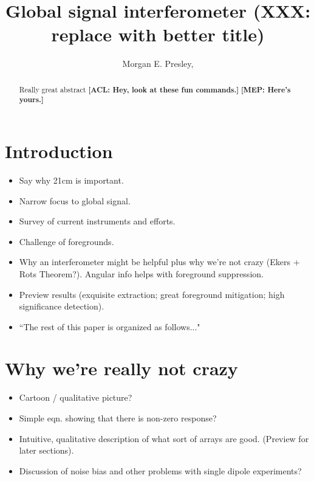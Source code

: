 \documentclass[twolcolumn,apj]{emulateapj}
\newcommand{\acl}[1]{{\color{red} \textbf{[ACL:  #1]}}}
\newcommand{\mep}[1]{{\color{blue} \textbf{[MEP:  #1]}}}
\begin{document}
\title{Global signal interferometer (XXX: replace with better title)}

\author{Morgan E. Presley,
}

\begin{abstract}
Really great abstract
\acl{Hey, look at these fun commands.}
\mep{Here's yours.}
\end{abstract}



\section{Introduction}
\begin{itemize}
\item Say why 21cm is important.
\item Narrow focus to global signal.
\item Survey of current instruments and efforts.
\item Challenge of foregrounds.
\item Why an interferometer might be helpful plus why we're not crazy (Ekers + Rots Theorem?).  Angular info helps with foreground suppression.
\item Preview results (exquisite extraction; great foreground mitigation; high significance detection).
\item ``The rest of this paper is organized as follows..."
\end{itemize}

\section{Why we're really not crazy}
\begin{itemize}
\item Cartoon / qualitative picture?
\item Simple eqn. showing that there is non-zero response?
\item Intuitive, qualitative description of what sort of arrays are good.  (Preview for later sections).
\item Discussion of noise bias and other problems with single dipole experiments?
\end{itemize}
\end{document}
